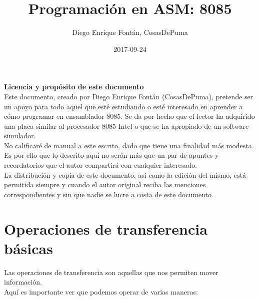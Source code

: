 \documentclass[12pt]{article}
\title{\textbf{Programación en ASM: 8085}}
\date{2017-09-24}
\author{Diego Enrique Fontán, CosasDePuma}
\begin{document}
	\maketitle
	
	\newpage
	
	\tableofcontents
	
	\newpage
	
	
	
	\textbf{Licencia y propósito de este documento}\\
	
	Este documento, creado por Diego Enrique Fontán (CosasDePuma), pretende ser un apoyo para todo aquel que esté estudiando o esté interesado en aprender a cómo programar en ensamblador 8085. Se da por hecho que el lector ha adquirido una placa similar al procesador 8085 Intel o que se ha apropiado de un software simulador.\\
	
	No calificaré de manual a este escrito, dado que tiene una finalidad más modesta. Es por ello que lo descrito aquí no serán más que un par de apuntes y recordatorios que el autor compartirá con cualquier interesado.\\
	
	La distribución y copia de este documento, así como la edición del mismo, está permitida siempre y cuando el autor original reciba las menciones correspondientes y sin que nadie se lucre a costa de este documento.\\
	
	\newpage
	
	\section{Operaciones de transferencia básicas}
	
	Las operaciones de transferencia son aquellas que nos permiten mover información.\\
	Aquí es importante ver que podemos operar de varias maneras:
	
	
\end{document}

